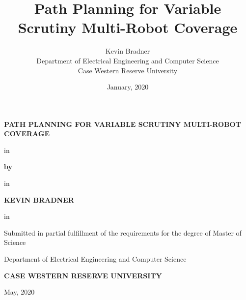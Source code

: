 \title{Path Planning for Variable Scrutiny Multi-Robot Coverage}

\author{Kevin Bradner\\Department of Electrical Engineering and Computer Science\\Case Western Reserve University}
\date{January, 2020}

\begin{center}
\begin{huge}
\textbf{PATH PLANNING FOR VARIABLE SCRUTINY MULTI-ROBOT COVERAGE}

 in

\textbf{by}

 in

\textbf{KEVIN BRADNER}
\end{huge}

\begin{Large}

 in

Submitted in partial fulfillment of the requirements for the degree of Master of Science

Department of Electrical Engineering and Computer Science

\textbf{CASE WESTERN RESERVE UNIVERSITY}

May, 2020
\end{Large}
\end{center}

\clearpage

